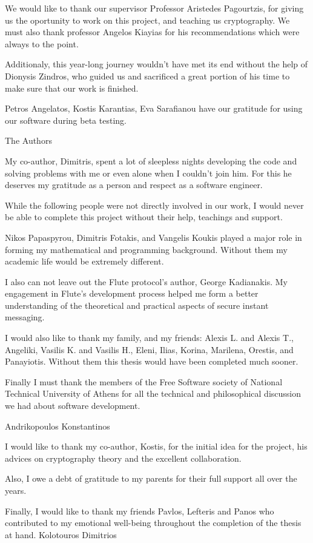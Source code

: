 \documentclass[
11pt, %
english, %
singlespacing, %
parskip, %
headsepline, %
]{MastersDoctoralThesis} %
\begin{document}
\begin{acknowledgements}
\addchaptertocentry{\acknowledgementname} %

We would like to thank our supervisor Professor Aristedes Pagourtzis, for giving us the oportunity to work on this project, and teaching us cryptography.
We must also thank professor Angelos Kiayias for his recommendations which were always to the point.

Additionaly, this year-long journey wouldn't have met its end without the help of Dionysis Zindros, who guided us and sacrificed a great portion of his time to make sure that our work is finished.

Petros Angelatos, Kostis Karantias, Eva Sarafianou have our gratitude for using our software during beta testing.

\bigbreak
\hfill The Authors

My co-author, Dimitris, spent a lot of sleepless nights developing the code and solving problems with me or even alone when I couldn't join him.
For this he deserves my gratitude as a person and respect as a software engineer.

While the following people were not directly involved in our work, I would never be able to complete this project without their help, teachings and support.

Nikos Papaspyrou, Dimitris Fotakis, and Vangelis Koukis played a major role in forming my mathematical and programming background.
Without them my academic life would be extremely different.

I also can not leave out the Flute protocol's author, George Kadianakis.
My engagement in Flute's development process helped me form a better understanding of the theoretical and practical aspects of secure instant messaging.

I would also like to thank my family, and my friends: Alexis L. and Alexis T., Angeliki, Vasilis K. and Vasilis H., Eleni, Ilias, Korina, Marilena, Orestis, and Panayiotis.
Without them this thesis would have been completed much sooner.

Finally I must thank the members of the Free Software society of National Technical University of Athens for all the technical and philosophical discussion we had about software development.

\bigbreak
\hfill Andrikopoulos Konstantinos

I would like to thank my co-author, Kostis, for the initial idea for the project, his advices on cryptography theory and the excellent collaboration.

Also, I owe a debt of gratitude to my parents for their full support all over the years.

Finally, I would like to thank my friends Pavlos, Lefteris and Panos who contributed to my emotional well-being throughout the completion of the thesis at hand.
\bigbreak
\hfill Kolotouros Dimitrios


\end{acknowledgements}
\end{document}
